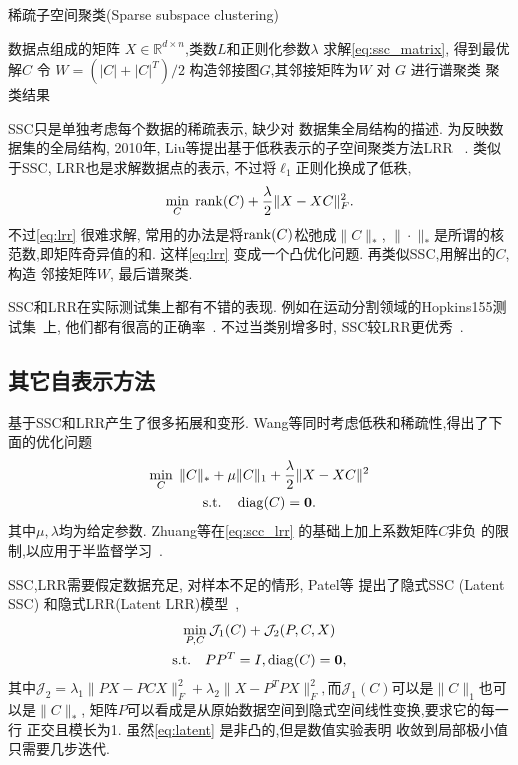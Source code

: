\begin{algorithm}[tb]
  \caption{稀疏子空间聚类(Sparse subspace clustering)}
  \label{alg:ssc}
  \begin{algorithmic}
    数据点组成的矩阵 \(X\in \mathbb{R}^{d\times
    n}\),类数\(L\)和正则化参数\(\lambda\)
     求解\eqref{eq:ssc_matrix},  得到最优解\(C\)
     令 \(W=(|C|+|C|^T)/2\) 构造邻接图\(G\),其邻接矩阵为\(W\)
     对 \(G\) 进行谱聚类 
     聚类结果
  \end{algorithmic}
\end{algorithm}

SSC只是单独考虑每个数据的稀疏表示, 缺少对
数据集全局结构的描述. 为反映数据集的全局结构,
2010年, Liu等提出基于低秩表示的子空间聚类方法LRR~\cite{liu2010robust} .
类似于SSC, LRR也是求解数据点的表示,
不过将\(\ell_1\)正则化换成了低秩,
\begin{equation}
  \min_{C} \; \operatorname{rank}(C)+\frac{\lambda}{2}\|X-XC\|_F^2. \label{eq:lrr}
\end{equation}
不过\eqref{eq:lrr} 很难求解, 常用的办法是将\(\operatorname{rank}(C)\)松弛成\(\|C\|_*\),
\(\|\cdot\|_*\)是所谓的核范数,即矩阵奇异值的和.
这样\eqref{eq:lrr} 变成一个凸优化问题. 再类似SSC,用解出的\(C\),构造
邻接矩阵\(W\), 最后谱聚类.

SSC和LRR在实际测试集上都有不错的表现.
例如在运动分割领域的Hopkins155测试集~\cite{tron2007benchmark}上,
他们都有很高的正确率~\cite{elhamifar2013sparse, liu2013robust}.
不过当类别增多时, SSC较LRR更优秀~\cite{elhamifar2013sparse}.

\subsection{其它自表示方法}
基于SSC和LRR产生了很多拓展和变形.
Wang等同时考虑低秩和稀疏性,得出了下面的优化问题~\cite{wang2013provable}
\begin{equation}\label{eq:scc_lrr}
  \begin{gathered}
    \min_{C} \; \|C\|_*+\mu \|C\|_1+\frac{\lambda}{2}\|X-XC\|^2 \\
    \text{s.t.}\quad \operatorname{diag}(C) = \mathbf{0}.
  \end{gathered}
\end{equation}
其中\(\mu,\lambda\)均为给定参数. 
Zhuang等在\eqref{eq:scc_lrr} 的基础上加上系数矩阵\(C\)非负
的限制,以应用于半监督学习~\cite{zhuang2012non}.

SSC,LRR需要假定数据充足, 对样本不足的情形, Patel等
提出了隐式SSC (Latent SSC) 和隐式LRR(Latent LRR)模型~\cite{patel2015latent},
\begin{equation}
  \begin{gathered}
    \min_{P,C} \mathcal{J}_1(C)+\mathcal{J}_2(P, C, X) \\
    \text{s.t.}\quad PP^T=I, \operatorname{diag}(C)=\mathbf{0},
  \end{gathered}
  \label{eq:latent}
\end{equation}
其中\(\mathcal{J}_2=\lambda_1\|PX-PCX\|_F^2+\lambda_2\|X-P^TP
X\|_F^2,\)而\(\mathcal{J}_1(C)\)可以是\(\|C\|_1\)也可以是\(\|C\|_*\),
矩阵\(P\)可以看成是从原始数据空间到隐式空间线性变换,要求它的每一行
正交且模长为1. 虽然\eqref{eq:latent} 是非凸的,但是数值实验表明
收敛到局部极小值只需要几步迭代.

